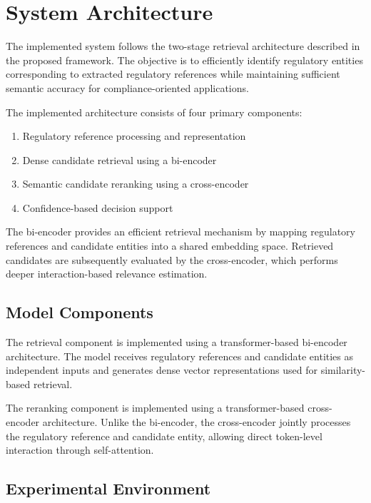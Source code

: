 \section{System Architecture}

The implemented system follows the two-stage retrieval architecture described in the proposed framework. The objective is to efficiently identify regulatory entities corresponding to extracted regulatory references while maintaining sufficient semantic accuracy for compliance-oriented applications.

The implemented architecture consists of four primary components:

\begin{enumerate}
    \item Regulatory reference processing and representation
    \item Dense candidate retrieval using a bi-encoder
    \item Semantic candidate reranking using a cross-encoder
    \item Confidence-based decision support
\end{enumerate}

The bi-encoder provides an efficient retrieval mechanism by mapping regulatory references and candidate entities into a shared embedding space. Retrieved candidates are subsequently evaluated by the cross-encoder, which performs deeper interaction-based relevance estimation.

\subsection{Model Components}

The retrieval component is implemented using a transformer-based bi-encoder architecture. The model receives regulatory references and candidate entities as independent inputs and generates dense vector representations used for similarity-based retrieval.

The reranking component is implemented using a transformer-based cross-encoder architecture. Unlike the bi-encoder, the cross-encoder jointly processes the regulatory reference and candidate entity, allowing direct token-level interaction through self-attention.

\subsection{Experimental Environment}

